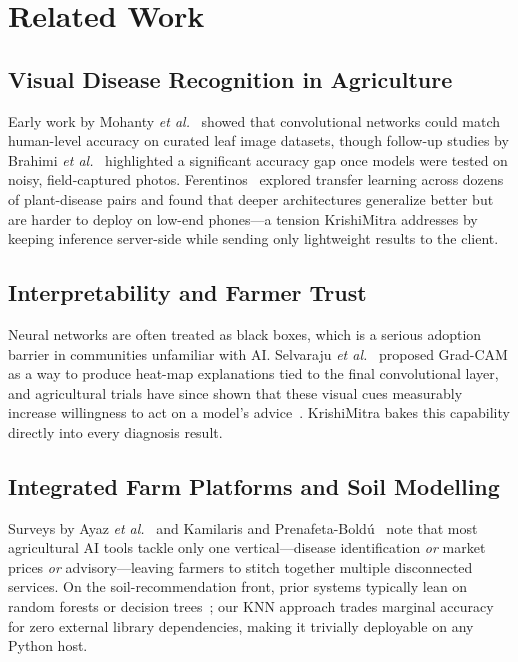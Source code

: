 \documentclass[conference]{IEEEtran}
\begin{document}
\section{Related Work}

\subsection{Visual Disease Recognition in Agriculture}
Early work by Mohanty \textit{et
al.}~\cite{mohanty2016} showed that convolutional networks could match human-level accuracy on
curated leaf image datasets, though follow-up studies by Brahimi \textit{et al.}~\cite{brahimi2017}
highlighted a significant accuracy gap once models were tested on noisy, field-captured photos.
Ferentinos~\cite{ferentinos2018} explored transfer learning across dozens of plant-disease pairs and
found that deeper architectures generalize better but are harder to deploy on low-end phones---a
tension KrishiMitra addresses by keeping inference server-side while sending only lightweight
results to the client.

\subsection{Interpretability and Farmer Trust}
Neural networks are often treated as black boxes,
which is a serious adoption barrier in communities unfamiliar with AI. Selvaraju \textit{et
al.}~\cite{gradcam} proposed Grad-CAM as a way to produce heat-map explanations tied to the final
convolutional layer, and agricultural trials have since shown that these visual cues measurably
increase willingness to act on a model's advice~\cite{ramcharan2017}. KrishiMitra bakes this
capability directly into every diagnosis result.

\subsection{Integrated Farm Platforms and Soil Modelling}
Surveys by Ayaz \textit{et
al.}~\cite{ayaz2019} and Kamilaris and Prenafeta-Bold\'u~\cite{kamilaris2018} note that most
agricultural AI tools tackle only one vertical---disease identification \textit{or} market prices
\textit{or} advisory---leaving farmers to stitch together multiple disconnected services. On the
soil-recommendation front, prior systems typically lean on random forests or decision
trees~\cite{pudumalar2017}; our KNN approach trades marginal accuracy for zero external library
dependencies, making it trivially deployable on any Python host.
\end{document}
